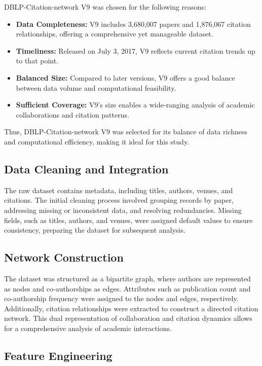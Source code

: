 \documentclass[11pt]{article}
\begin{document}
DBLP-Citation-network V9 was chosen for the following reasons:

\begin{itemize}
	\item \textbf{Data Completeness:} V9 includes 3,680,007 papers and 1,876,067 citation relationships, offering a comprehensive yet manageable dataset.
	\item \textbf{Timeliness:} Released on July 3, 2017, V9 reflects current citation trends up to that point.
	\item \textbf{Balanced Size:} Compared to later versions, V9 offers a good balance between data volume and computational feasibility.
	\item \textbf{Sufficient Coverage:} V9’s size enables a wide-ranging analysis of academic collaborations and citation patterns.
\end{itemize}

Thus, DBLP-Citation-network V9 was selected for its balance of data richness and computational efficiency, making it ideal for this study.


\subsection{Data Cleaning and Integration}

The raw dataset contains metadata, including titles, authors, venues, and citations. The initial cleaning process involved grouping records by paper, addressing missing or inconsistent data, and resolving redundancies. Missing fields, such as titles, authors, and venues, were assigned default values to ensure consistency, preparing the dataset for subsequent analysis.

\subsection{Network Construction}

The dataset was structured as a bipartite graph, where authors are represented as nodes and co-authorships as edges. Attributes such as publication count and co-authorship frequency were assigned to the nodes and edges, respectively. Additionally, citation relationships were extracted to construct a directed citation network. This dual representation of collaboration and citation dynamics allows for a comprehensive analysis of academic interactions.

\subsection{Feature Engineering}
\end{document}
